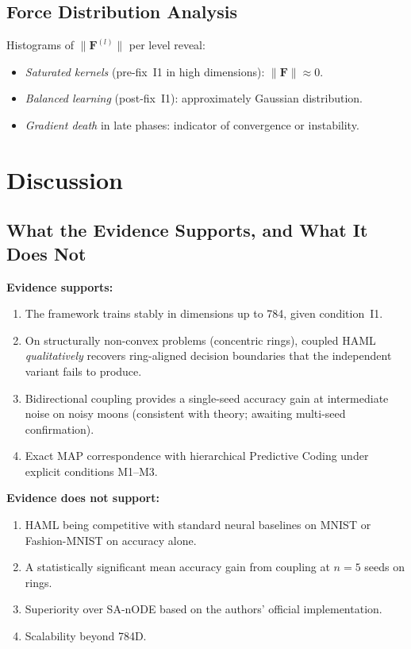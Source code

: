 \documentclass[11pt,a4paper]{article}
\begin{document}
\subsection{Force Distribution Analysis}

Histograms of $\|\mathbf{F}^{(l)}\|$ per level reveal:
\begin{itemize}
  \item \emph{Saturated kernels} (pre-fix~I1 in high dimensions): $\|\mathbf{F}\| \approx 0$.
  \item \emph{Balanced learning} (post-fix~I1): approximately Gaussian distribution.
  \item \emph{Gradient death} in late phases: indicator of convergence or instability.
\end{itemize}

\section{Discussion}

\subsection{What the Evidence Supports, and What It Does Not}

\textbf{Evidence supports:}
\begin{enumerate}
  \item The framework trains stably in dimensions up to 784, given condition~I1.
  \item On structurally non-convex problems (concentric rings), coupled HAML
        \emph{qualitatively} recovers ring-aligned decision boundaries that the
        independent variant fails to produce.
  \item Bidirectional coupling provides a single-seed accuracy gain at intermediate
        noise on noisy moons (consistent with theory; awaiting multi-seed confirmation).
  \item Exact MAP correspondence with hierarchical Predictive Coding under explicit
        conditions M1--M3.
\end{enumerate}

\textbf{Evidence does not support:}
\begin{enumerate}
  \item HAML being competitive with standard neural baselines on MNIST or Fashion-MNIST
        on accuracy alone.
  \item A statistically significant mean accuracy gain from coupling at $n=5$ seeds on
        rings.
  \item Superiority over SA-nODE based on the authors' official implementation.
  \item Scalability beyond 784D.
\end{enumerate}
\end{document}
